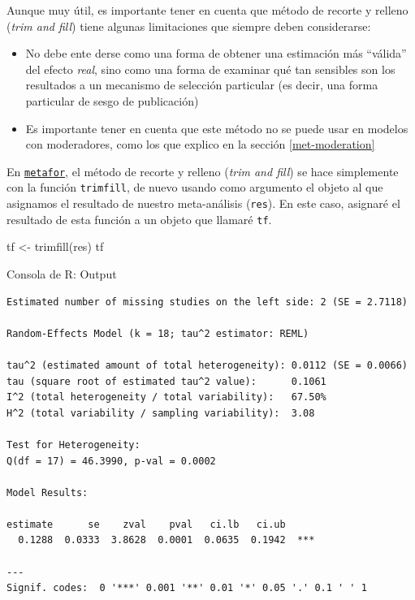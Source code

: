 \documentclass[
  bookmarksnumbered]{article}
\newenvironment{Shaded}{\begin{snugshade}}{\end{snugshade}}
\newcommand{\FunctionTok}[1]{\textcolor[rgb]{0.39,0.29,0.61}{#1}}
\newcommand{\NormalTok}[1]{\textcolor[rgb]{0.12,0.11,0.11}{#1}}
\newcommand{\OtherTok}[1]{\textcolor[rgb]{0.00,0.43,0.16}{#1}}
\begin{document}
Aunque muy útil, es importante tener en cuenta que método de recorte y relleno (\emph{trim and fill}) tiene algunas limitaciones que siempre deben considerarse:

\begin{itemize}
\item
  No debe ente derse como una forma de obtener una estimación más ``válida'' del efecto \emph{real}, sino como una forma de examinar qué tan sensibles son los resultados a un mecanismo de selección particular (es decir, una forma particular de sesgo de publicación)
\item
  Es importante tener en cuenta que este método no se puede usar en modelos con moderadores, como los que explico en la sección \ref{met-moderation}
\end{itemize}

En \href{https://www.metafor-project.org/doku.php}{\texttt{metafor}}, el método de recorte y relleno (\emph{trim and fill}) se hace simplemente con la función \texttt{trimfill}, de nuevo usando como argumento el objeto al que asignamos el resultado de nuestro meta-análisis (\texttt{res}). En este caso, asignaré el resultado de esta función a un objeto que llamaré \texttt{tf}.

\begin{Shaded}
\begin{Highlighting}[]
\NormalTok{tf }\OtherTok{\textless{}{-}} \FunctionTok{trimfill}\NormalTok{(res)}
\NormalTok{tf}
\end{Highlighting}
\end{Shaded}

\begin{ROut}{Consola de R: Output~\thetcbcounter}
                \begin{footnotesize}
                \begin{verbatim} 
Estimated number of missing studies on the left side: 2 (SE = 2.7118)

Random-Effects Model (k = 18; tau^2 estimator: REML)

tau^2 (estimated amount of total heterogeneity): 0.0112 (SE = 0.0066)
tau (square root of estimated tau^2 value):      0.1061
I^2 (total heterogeneity / total variability):   67.50%
H^2 (total variability / sampling variability):  3.08

Test for Heterogeneity:
Q(df = 17) = 46.3990, p-val = 0.0002

Model Results:

estimate      se    zval    pval   ci.lb   ci.ub      
  0.1288  0.0333  3.8628  0.0001  0.0635  0.1942  *** 

---
Signif. codes:  0 '***' 0.001 '**' 0.01 '*' 0.05 '.' 0.1 ' ' 1
 \end{verbatim}
                \end{footnotesize}
                \end{ROut}
\end{document}
